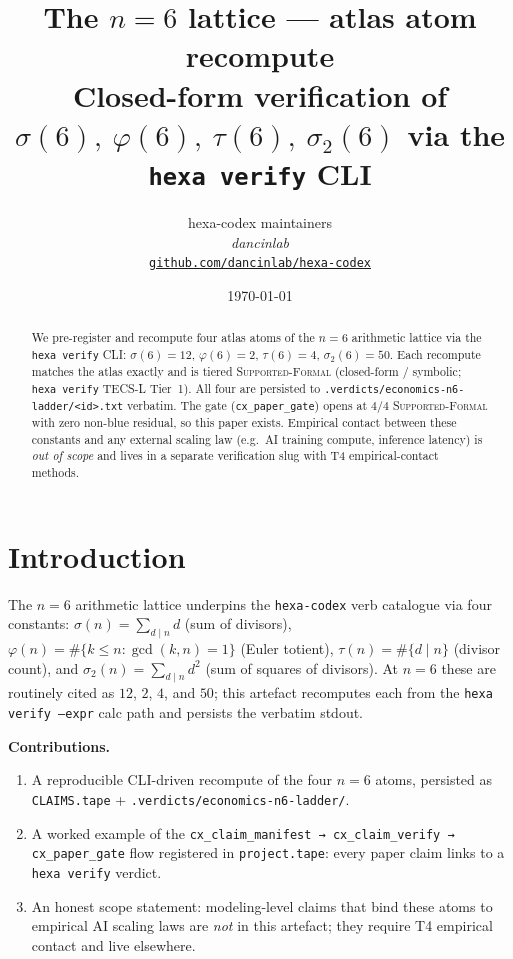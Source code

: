 \documentclass[11pt,a4paper]{article}
\title{
  \textbf{The $n=6$ lattice --- atlas atom recompute}\\[4pt]
  \large Closed-form verification of $\sigma(6),\ \varphi(6),\ \tau(6),\ \sigma_2(6)$
  via the \texttt{hexa verify} CLI
}
\author{
  hexa-codex maintainers\\
  \normalsize\textit{dancinlab}\\[2pt]
  \normalsize\href{https://github.com/dancinlab/hexa-codex}{\texttt{github.com/dancinlab/hexa-codex}}
}
\date{\today}
\begin{document}
\maketitle

\begin{abstract}
We pre-register and recompute four atlas atoms of the $n=6$ arithmetic
lattice via the \texttt{hexa verify} CLI:
$\sigma(6) = 12$, $\varphi(6) = 2$, $\tau(6) = 4$, $\sigma_2(6) = 50$.
Each recompute matches the atlas exactly and is tiered
\textsc{Supported-Formal} (closed-form / symbolic; \texttt{hexa verify}
TECS-L Tier~1). All four are persisted to
\texttt{.verdicts/economics-n6-ladder/<id>.txt} verbatim. The gate
(\texttt{cx\_paper\_gate}) opens at $4/4$ \textsc{Supported-Formal} with
zero non-blue residual, so this paper exists. Empirical contact between
these constants and any external scaling law (e.g.\ AI training compute,
inference latency) is \emph{out of scope} and lives in a separate
verification slug with T4 empirical-contact methods.
\end{abstract}

\section{Introduction}
\label{sec:intro}

The $n=6$ arithmetic lattice underpins the \texttt{hexa-codex} verb
catalogue via four constants:
$\sigma(n) = \sum_{d \mid n} d$ (sum of divisors),
$\varphi(n) = \#\{k \le n : \gcd(k,n) = 1\}$ (Euler totient),
$\tau(n) = \#\{d \mid n\}$ (divisor count), and
$\sigma_2(n) = \sum_{d \mid n} d^2$ (sum of squares of divisors).
At $n = 6$ these are routinely cited as $12$, $2$, $4$, and $50$; this
artefact recomputes each from the \texttt{hexa verify --expr} calc
path and persists the verbatim stdout.

\medskip
\noindent\textbf{Contributions.}
\begin{enumerate}\itemsep0.3em
\item A reproducible CLI-driven recompute of the four $n=6$ atoms,
      persisted as \texttt{CLAIMS.tape} +
      \texttt{.verdicts/economics-n6-ladder/}.
\item A worked example of the \texttt{cx\_claim\_manifest →
      cx\_claim\_verify → cx\_paper\_gate} flow registered in
      \texttt{project.tape}: every paper claim links to a
      \texttt{hexa verify} verdict.
\item An honest scope statement: modeling-level claims that bind these
      atoms to empirical AI scaling laws are \emph{not} in this
      artefact; they require T4 empirical contact and live elsewhere.
\end{enumerate}
\end{document}
